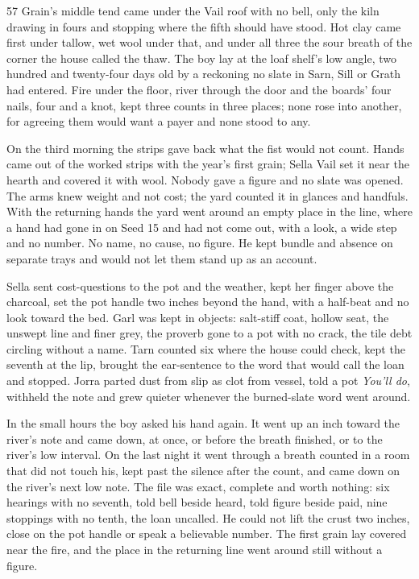 \begin{CRchronicle}{57}
Grain’s middle tend came under the Vail roof with no bell, only the kiln drawing in fours and stopping where the fifth should have stood. Hot clay came first under tallow, wet wool under that, and under all three the sour breath of the corner the house called the thaw. The boy lay at the loaf shelf’s low angle, two hundred and twenty-four days old by a reckoning no slate in Sarn, Sill or Grath had entered. Fire under the floor, river through the door and the boards’ four nails, four and a knot, kept three counts in three places; none rose into another, for agreeing them would want a payer and none stood to any.

On the third morning the strips gave back what the fist would not count. Hands came out of the worked strips with the year’s first grain; Sella Vail set it near the hearth and covered it with wool. Nobody gave a figure and no slate was opened. The arms knew weight and not cost; the yard counted it in glances and handfuls. With the returning hands the yard went around an empty place in the line, where a hand had gone in on Seed 15 and had not come out, with a look, a wide step and no number. No name, no cause, no figure. He kept bundle and absence on separate trays and would not let them stand up as an account.

Sella sent cost-questions to the pot and the weather, kept her finger above the charcoal, set the pot handle two inches beyond the hand, with a half-beat and no look toward the bed. Garl was kept in objects: salt-stiff coat, hollow seat, the unswept line and finer grey, the proverb gone to a pot with no crack, the tile debt circling without a name. Tarn counted six where the house could check, kept the seventh at the lip, brought the ear-sentence to the word that would call the loan and stopped. Jorra parted dust from slip as clot from vessel, told a pot \emph{You’ll do}, withheld the note and grew quieter whenever the burned-slate word went around.

In the small hours the boy asked his hand again. It went up an inch toward the river’s note and came down, at once, or before the breath finished, or to the river’s low interval. On the last night it went through a breath counted in a room that did not touch his, kept past the silence after the count, and came down on the river’s next low note. The file was exact, complete and worth nothing: six hearings with no seventh, told bell beside heard, told figure beside paid, nine stoppings with no tenth, the loan uncalled. He could not lift the crust two inches, close on the pot handle or speak a believable number. The first grain lay covered near the fire, and the place in the returning line went around still without a figure.
\end{CRchronicle}
